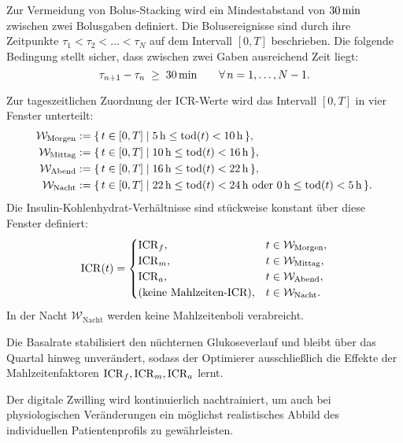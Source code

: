 Zur Vermeidung von Bolus-Stacking wird ein Mindestabstand von \(30\,\mathrm{min}\)\cite{cengiz2022ispad,ada2024standards,walsh2016pumping} zwischen zwei Bolusgaben definiert. Die Bolusereignisse sind durch ihre Zeitpunkte \(\tau_1 < \tau_2 < \dots < \tau_N\) auf dem Intervall \([0,T]\) beschrieben. Die folgende Bedingung stellt sicher, dass zwischen zwei Gaben ausreichend Zeit liegt:
\[
\tau_{n+1} - \tau_n \;\ge\; 30\,\mathrm{min} \qquad \forall\, n=1,\dots,N-1.
\]

Zur tageszeitlichen Zuordnung der ICR-Werte wird das Intervall \([0,T]\) in vier Fenster unterteilt:
\[
\begin{aligned}
\mathcal{W}_{\mathrm{Morgen}} &:= \{\, t\in[0,T] \mid 5\,\mathrm{h} \le \mathrm{tod}(t) < 10\,\mathrm{h} \,\},\\
\mathcal{W}_{\mathrm{Mittag}} &:= \{\, t\in[0,T] \mid 10\,\mathrm{h} \le \mathrm{tod}(t) < 16\,\mathrm{h} \,\},\\
\mathcal{W}_{\mathrm{Abend}}  &:= \{\, t\in[0,T] \mid 16\,\mathrm{h} \le \mathrm{tod}(t) < 22\,\mathrm{h} \,\},\\
\mathcal{W}_{\mathrm{Nacht}}  &:= \{\, t\in[0,T] \mid 22\,\mathrm{h} \le \mathrm{tod}(t) < 24\,\mathrm{h} \ \text{oder}\ 0\,\mathrm{h} \le \mathrm{tod}(t) < 5\,\mathrm{h} \,\}.
\end{aligned}
\]
Die Insulin-Kohlenhydrat-Verhältnisse sind stückweise konstant über diese Fenster definiert:
\[
\mathrm{ICR}(t)=
\begin{cases}
\mathrm{ICR}_f, & t \in \mathcal{W}_{\mathrm{Morgen}},\\
\mathrm{ICR}_m, & t \in \mathcal{W}_{\mathrm{Mittag}},\\
\mathrm{ICR}_a, & t \in \mathcal{W}_{\mathrm{Abend}},\\
\text{(keine Mahlzeiten-ICR)}, & t \in \mathcal{W}_{\mathrm{Nacht}}.
\end{cases}
\]
In der Nacht \(\mathcal{W}_{\mathrm{Nacht}}\) werden keine Mahlzeitenboli verabreicht.

Die Basalrate stabilisiert den nüchternen Glukoseverlauf und bleibt über das Quartal hinweg unverändert, sodass der Optimierer ausschließlich die Effekte der Mahlzeitenfaktoren \(\mathrm{ICR}_f, \mathrm{ICR}_m, \mathrm{ICR}_a\) lernt.

Der digitale Zwilling wird kontinuierlich nachtrainiert, um auch bei physiologischen Veränderungen ein möglichst realistisches Abbild des individuellen Patientenprofils zu gewährleisten.